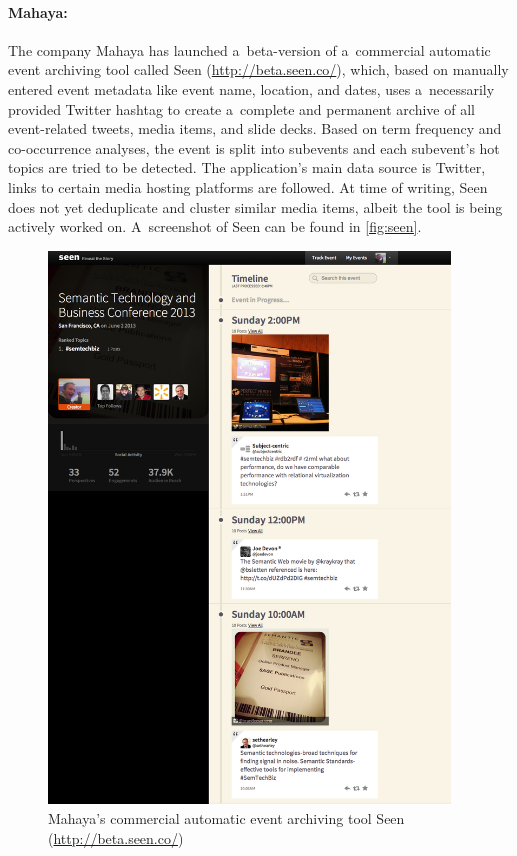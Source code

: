 \paragraph{Mahaya:}
 
The company Mahaya has launched a~beta-version
of a~commercial automatic event archiving tool called Seen
(\url{http://beta.seen.co/}),
which, based on manually entered event metadata like event name,
location, and dates, uses a~necessarily provided Twitter hashtag
to create a~complete and permanent archive of all event-related tweets,
media items, and slide decks.
Based on term frequency and co-occurrence analyses,
the event is split into subevents
and each subevent's hot topics are tried to be detected.
The application's main data source is Twitter,
links to certain media hosting platforms are followed.
At time of writing, Seen does not yet deduplicate and cluster
similar media items,
albeit the tool is being actively worked on.
A~screenshot of Seen can be found in \autoref{fig:seen}.

\begin{figure}
  \centering
  \includegraphics[width=0.95\textwidth,height=0.9\textheight,keepaspectratio]{seen.png}
  \caption[Mahaya's commercial automatic event archiving tool Seen]{Mahaya's commercial automatic event archiving tool Seen
    (\url{http://beta.seen.co/})}
  \label{fig:seen}
\end{figure}

